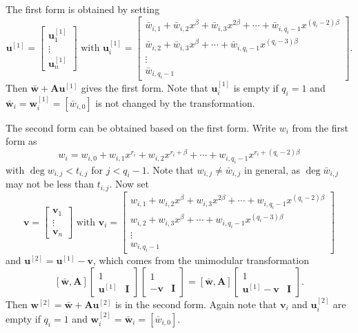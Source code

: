\begin{pf}
The first form is obtained by setting \[
\mathbf{u}^{[1]}=\begin{bmatrix}\mathbf{u}_{1}^{[1]}\\
\vdots\\
\mathbf{u}_{n}^{[1]}\end{bmatrix}\mbox{ with }\mathbf{u}_{i}^{[1]}=\left[\begin{array}{r}
\bar{w}_{i,1}+\bar{w}_{i,2}x^{\beta}+\bar{w}_{i,3}x^{2\beta}+\cdots+\bar{w}_{i,q_{i}-1}x^{(q_{i}-2)\beta}\\
\bar{w}_{i,2}+\bar{w}_{i,3}x^{\beta}+\cdots+\bar{w}_{i,q_{i}-1}x^{(q_{i}-3)\beta}\\
\vdots~~~~~\\
\bar{w}_{i,q_{i}-1}\end{array}\right].\]
 Then $\bar{\mathbf{w}}+\mathbf{A}\mathbf{u}^{[1]}$ gives the first
form. Note that $\mathbf{u}_{i}^{[1]}$ is empty if $q_{i}=1$ and
$\bar{\mathbf{w}}_{i}=\mathbf{w}_{i}^{[1]}=[\bar{w}_{i,0}]$ is not
changed by the transformation.

The second form can be obtained based on the first form. Write $w_{i}$
from the first form as \begin{equation}
w_{i}=w_{i,0}+w_{i,1}x^{r_{i}}+w_{i,2}x^{r_{i}+\beta}+\cdots+w_{i,q_{i}-1}x^{r_{i}+(q_{i}-2)\beta}\label{eq:wiSeparatedForm}\end{equation}
 with $\deg w_{i,j}<t_{i,j}$ for $j<q_{i}-1$. Note that $w_{i,j}\ne\bar{w}_{i,j}$
in general, as $\deg\bar{w}_{i,j}$ may not be less than $t_{i,j}$.
Now set \[
\mathbf{v}=\begin{bmatrix}\mathbf{v}_{1}\\
\vdots\\
\mathbf{v}_{n}\end{bmatrix}\mbox{ with }\mathbf{v}_{i}=\left[\begin{array}{r}
w_{i,1}+w_{i,2}x^{\beta}+w_{i,3}x^{2\beta}+\cdots+w_{i,q_{i}-1}x^{(q_{i}-2)\beta}\\
w_{i,2}+w_{i,3}x^{\beta}+\cdots+w_{i,q_{i}-1}x^{(q_{i}-3)\beta}\\
\vdots~~~~~\\
w_{i,q_{i}-1}\end{array}\right]\]
 and $\mathbf{u}^{[2]}=\mathbf{u}^{[1]}-\mathbf{v}$, which comes
from the unimodular transformation \[
\left[\bar{\mathbf{w}},\mathbf{A}\right]\left[\begin{array}{cc}
1\\
\mathbf{\mathbf{u}}^{[1]} & \mathbf{I}\end{array}\right]\begin{bmatrix}1\\
-\mathbf{v} & \mathbf{I}\end{bmatrix}=\left[\bar{\mathbf{w}},\mathbf{A}\right]\begin{bmatrix}1\\
\mathbf{u}^{[1]}-\mathbf{v} & \mathbf{I}\end{bmatrix}.\]
 Then $\mathbf{w}^{[2]}=\bar{\mathbf{w}}+\mathbf{A}\mathbf{u}^{[2]}$
is in the second form. Again note that $\mathbf{v}_{i}$ and $\mathbf{u}_{i}^{[2]}$
are empty if $q_{i}=1$ and $\mathbf{w}_{i}^{[2]}=\bar{\mathbf{w}}_{i}=[\bar{w}_{i,0}]$.\end{pf}
